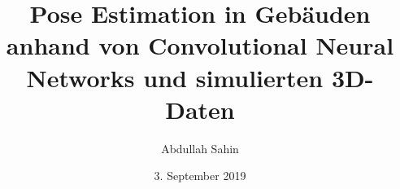 \documentclass[%
ngerman,        %
]{iib_thesis}
\title{Pose Estimation in Gebäuden anhand von Convolutional Neural Networks und simulierten 3D-Daten}
\author{Abdullah Sahin}
\date{3. September 2019}
\begin{document}
	

\pagebreak

\pagebreak

\pagebreak

\pagebreak

\pagebreak

\end{document}
